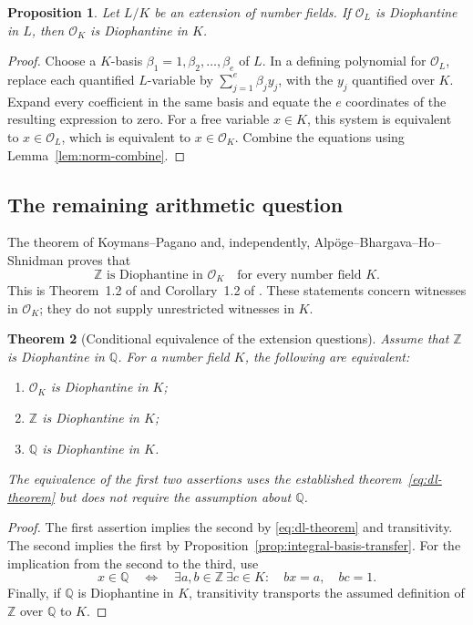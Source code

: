 \documentclass[11pt]{article}
\newtheorem{theorem}{Theorem}[section]
\newtheorem{proposition}[theorem]{Proposition}
\theoremstyle{definition}
\begin{document}
\begin{proposition}\label{prop:descent-integrality}
Let $L/K$ be an extension of number fields.  If $\mathcal O_L$ is
Diophantine in $L$, then $\mathcal O_K$ is Diophantine in $K$.
\end{proposition}
\begin{proof}
Choose a $K$-basis $\beta_1=1,\beta_2,\ldots,\beta_e$ of $L$.
In a defining polynomial for $\mathcal O_L$, replace each quantified
$L$-variable by $\sum_{j=1}^e\beta_j y_j$, with the $y_j$ quantified
over $K$.  Expand every coefficient in the same basis and equate the
$e$ coordinates of the resulting expression to zero.  For a free
variable $x\in K$, this system is equivalent to $x\in\mathcal O_L$,
which is equivalent to $x\in\mathcal O_K$.  Combine the equations
using Lemma~\ref{lem:norm-combine}.
\end{proof}

\subsection{The remaining arithmetic question}

The theorem of Koymans--Pagano and, independently,
Alp\"oge--Bhargava--Ho--Shnidman proves that
\begin{equation}\label{eq:dl-theorem}
 \mathbb Z\text{ is Diophantine in }\mathcal O_K
 \quad\text{for every number field }K.
\end{equation}
This is Theorem~1.2 of \cite{KoymansPagano2026} and Corollary~1.2 of
\cite{AlpogeBhargavaHoShnidman2026}.  These statements concern witnesses
in $\mathcal O_K$; they do not supply unrestricted witnesses in $K$.

\begin{theorem}[Conditional equivalence of the extension questions]
\label{thm:nf-equivalence}
Assume that $\mathbb Z$ is Diophantine in $\mathbb Q$.
For a number field $K$, the following are equivalent:
\begin{enumerate}
 \item $\mathcal O_K$ is Diophantine in $K$;
 \item $\mathbb Z$ is Diophantine in $K$;
 \item $\mathbb Q$ is Diophantine in $K$.
\end{enumerate}
The equivalence of the first two assertions uses the established
theorem~\eqref{eq:dl-theorem} but does not require the assumption about
$\mathbb Q$.
\end{theorem}
\begin{proof}
The first assertion implies the second by
\eqref{eq:dl-theorem} and transitivity.  The second implies the first
by Proposition~\ref{prop:integral-basis-transfer}.
For the implication from the second to the third, use
\[
 x\in\mathbb Q\quad\Longleftrightarrow\quad
 \exists a,b\in\mathbb Z\ \exists c\in K:
 \quad bx=a,\quad bc=1.
\]
Finally, if $\mathbb Q$ is Diophantine in $K$, transitivity transports
the assumed definition of $\mathbb Z$ over $\mathbb Q$ to $K$.
\end{proof}
\end{document}
